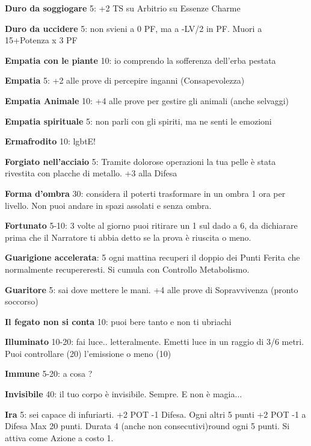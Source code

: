 \documentclass[a4paper,11pt,twoside,openany]{book}
\begin{document}
\textbf{Duro da soggiogare} 5: +2 TS su Arbitrio su Essenze Charme

\textbf{Duro da uccidere} 5: non svieni a 0 PF, ma a -LV/2 in PF. Muori a 15+Potenza x 3 PF

\textbf{Empatia con le piante} 10: io comprendo la sofferenza dell'erba pestata

\textbf{Empatia} 5: +2 alle prove di percepire inganni (Consapevolezza)

\textbf{Empatia Animale} 10: +4 alle prove per gestire gli animali (anche selvaggi)

\textbf{Empatia spirituale} 5: non parli con gli spiriti, ma ne senti le emozioni

\textbf{Ermafrodito} 10: lgbtE!

\textbf{Forgiato nell'acciaio} 5: Tramite dolorose operazioni la tua pelle è stata rivestita con placche di metallo. +3 alla Difesa

\textbf{Forma d'ombra} 30: considera il poterti trasformare in un ombra 1 ora per livello. Non puoi andare in spazi assolati e senza ombra.

\textbf{Fortunato} 5-10: 3 volte al giorno puoi ritirare un 1 sul dado a 6, da dichiarare prima che il Narratore ti abbia detto se la prova è riuscita o meno.

\textbf{Guarigione accelerata}: 5 ogni mattina recuperi il doppio dei Punti Ferita che normalmente recupereresti. Si cumula con Controllo Metabolismo. 

\textbf{Guaritore} 5: sai dove mettere le mani. +4 alle prove di Sopravvivenza (pronto soccorso)

\textbf{Il fegato non si conta} 10: puoi bere tanto e non ti ubriachi

\textbf{Illuminato} 10-20: fai luce.. letteralmente. Emetti luce in un raggio di 3/6 metri. Puoi controllare (20) l'emissione o meno (10)

\textbf{Immune} 5-20: a cosa ?

\textbf{Invisibile} 40: il tuo corpo è invisibile. Sempre. E non è magia...

\textbf{Ira} 5: sei capace di infuriarti. +2 POT -1 Difesa. Ogni altri 5 punti +2 POT -1 a Difesa Max 20 punti. Durata 4 (anche non consecutivi)round ogni 5 punti. Si attiva come Azione a costo 1.
\end{document}
